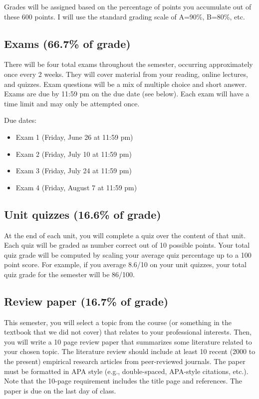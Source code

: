 \documentclass[10pt]{article}
\begin{document}
Grades will be assigned based on the percentage of points you accumulate out of these 600 points.  I will use the standard grading scale of A=90\%, B=80\%, etc.

\subsection*{Exams (66.7\% of grade)}
\label{sec:orgc1a213c}
There will be four total exams throughout the semester, occurring approximately once every 2 weeks.  They will cover material from your reading, online lectures, and quizzes.  Exam questions will be a mix of multiple choice and short answer.  Exams are due by 11:59 pm on the due date (see below).  Each exam will have a time limit and may only be attempted once.

Due dates:

\begin{itemize}
\item Exam 1 (Friday, June 26 at 11:59 pm)
\item Exam 2 (Friday, July 10 at 11:59 pm)
\item Exam 3 (Friday, July 24 at 11:59 pm)
\item Exam 4 (Friday, August 7 at 11:59 pm)
\end{itemize}

\subsection*{Unit quizzes (16.6\% of grade)}
\label{sec:org71fdd47}
At the end of each unit, you will complete a quiz over the content of that  unit. Each quiz will be graded as number correct out of 10 possible points.  Your total quiz grade will be computed by scaling your average quiz percentage up to a 100 point score.  For example, if you average 8.6/10 on your unit quizzes, your total quiz grade for the semester will be 86/100. 

\subsection*{Review paper (16.7\% of grade)}
\label{sec:org973c12e}
This semester, you will select a topic from the course (or something in the textbook that we did not cover) that relates to your professional interests.  Then, you will write a 10 page review paper that summarizes some literature related to your chosen topic. The literature review should include at least 10 recent (2000 to the present) empirical research articles from peer-reviewed journals. The paper must be formatted in APA style (e.g., double-spaced, APA-style citations, etc.).  Note that the 10-page requirement includes the title page and references.  The paper is due on the last day of class.   
\end{document}

